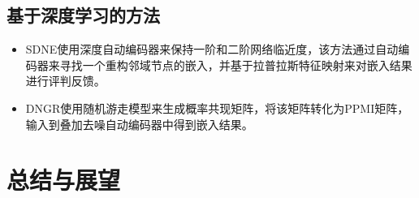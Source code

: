 \documentclass{ctexart}
\begin{document}
\subsection{基于深度学习的方法}
\begin{itemize}
    \item SDNE使用深度自动编码器来保持一阶和二阶网络临近度，该方法通过自动编码器来寻找一个重构邻域节点的嵌入，并基于拉普拉斯特征映射来对嵌入结果进行评判反馈。
    \item DNGR使用随机游走模型来生成概率共现矩阵，将该矩阵转化为PPMI矩阵，输入到叠加去噪自动编码器中得到嵌入结果。
\end{itemize}

\section{总结与展望}


\end{document}
